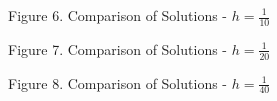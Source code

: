 \documentclass[11pt, oneside]{article}   	%
\begin{document}
\centerline {}
\centerline{Figure 6. Comparison of Solutions - $h = \frac{1}{10}$}

\centerline {}
\centerline{Figure 7. Comparison of Solutions - $h = \frac{1}{20}$}

\centerline {}
\centerline{Figure 8. Comparison of Solutions - $h = \frac{1}{40}$}
\end{document}
